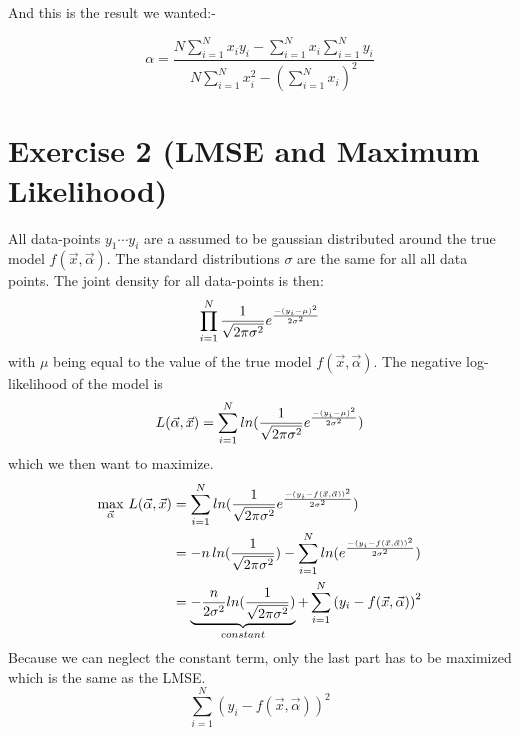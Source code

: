 \documentclass[]{article}
\newcommand{\summing}{\sum_{i=1}^N}
\begin{document}
And this is the result we wanted:-

\begin{equation}
\alpha = \frac{N\summing x_i y_i - \summing x_i \summing y_i}{N \summing x_i^2 - (\summing x_i)^2}
\end{equation}







\section{Exercise 2 (LMSE and Maximum Likelihood)} %
\label{sg:sec:ex2}

All data-points $y_1 \cdots y_i$ are a assumed to be gaussian distributed
around the true model $f(\vec{x}, \vec{\alpha})$. The standard distributions $\sigma$ are the same
for all all data points. The joint density for all data-points is then:
\begin{equation}
	\prod_{i=1}^{N} \frac{1}{\sqrt{2 \pi \sigma^2}} e^{-{{(y_i - \mu)}^2}\over{2 \sigma^2}}
\end{equation}
with $\mu$ being equal to the value of the true model $f(\vec{x}, \vec{\alpha})$.
The negative log-likelihood of the model is
\begin{equation}
	L(\vec{\alpha}, \vec{x}) = 
		\sum_{i=1}^{N} ln(\frac{1}{\sqrt{2 \pi \sigma^2}} e^{-{{(y_i - \mu)}^2}\over{2 \sigma^2}})
\end{equation}
which we then want to maximize.
\begin{equation}
	\begin{aligned}
		\max_{\vec{\alpha}} \, L(\vec{\alpha}, \vec{x}) 
		&= 
			\sum_{i=1}^{N} 
				ln(\frac{1}{\sqrt{2 \pi \sigma^2}} 
				e^{-{{(y_i - f(\vec{x}, \vec{\alpha}))}^2}\over{2 \sigma^2}}) \\
		&= 
			-n \, ln(\frac{1}{\sqrt{2 \pi \sigma^2}}) - 
			\sum_{i=1}^{N} ln(e^{-{{(y_i - f(\vec{x}, \vec{\alpha}))}^2}\over{2 \sigma^2}}) \\
		&= 
			\underbrace{-\frac{n}{2 \sigma^2}ln(\frac{1}{\sqrt{2 \pi \sigma^2}})}_{constant} + 
			\sum_{i=1}^{N} {(y_i - f(\vec{x}, \vec{\alpha}))}^2
	\end{aligned}
\end{equation}
Because we can neglect the constant term, only the last part has to be maximized 
which is the same as the LMSE.
\begin{equation}
	\sum_{i=1}^{N} {(y_i - f(\vec{x}, \vec{\alpha}))}^2
\end{equation}
\end{document}
